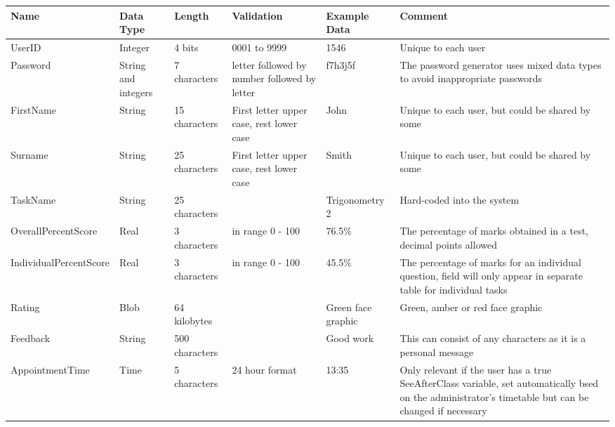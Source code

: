 \begin{center}
\begin{tabular}{|p{3.4cm}|p{1.2cm}|p{2cm}|p{2cm}|p{2cm}|p{3.5cm}|}
\hline
\textbf{Name} & \textbf{Data Type} & \textbf{Length} & \textbf{Validation} & \textbf{Example Data} & \textbf{Comment} \\ \hline
UserID & Integer & 4 bits & 0001 to 9999 & 1546 & Unique to each user \\ \hline
Password & String and integers & 7 characters & letter followed by number followed by letter & f7h3j5f & The password generator uses mixed data types to avoid inappropriate passwords \\ \hline
FirstName & String & 15 characters & First letter upper case, rest lower case & John & Unique to each user, but could be shared by some \\ \hline
Surname & String & 25 characters & First letter upper case, rest lower case & Smith & Unique to each user, but could be shared by some \\ \hline
TaskName & String & 25 characters & & Trigonometry 2 & Hard-coded into the system \\ \hline
OverallPercentScore & Real & 3 characters & in range 0 - 100 & 76.5\% & The percentage of marks obtained in a test, decimal points allowed \\ \hline
IndividualPercentScore & Real & 3 characters & in range 0 - 100 & 45.5\% & The percentage of marks for an individual question, field will only appear in separate table for individual tasks \\ \hline
Rating & Blob & 64 kilobytes & \ &  Green face graphic & Green, amber or red face graphic \\ \hline
Feedback & String & 500 characters & \ & Good work & This can consist of any characters as it is a personal message \\ \hline
AppointmentTime & Time & 5 characters & 24 hour format & 13:35 & Only relevant if the user has a true SeeAfterClass variable, set automatically bsed on the administrator's timetable but can be changed if necessary\\ \hline
\end{tabular}
\end{center}

